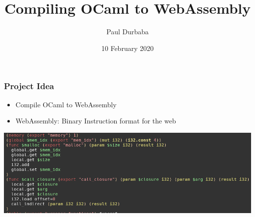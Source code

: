\documentclass[12pt]{beamer}
\title{Compiling OCaml to WebAssembly}
\author{Paul Durbaba}
\date{10 February 2020}
\begin{document}
	\begin{frame}
		\titlepage
	\end{frame}

	\begin{frame}
		\frametitle{Project Idea}
		\begin{itemize}
			\item Compile OCaml to WebAssembly
			\item WebAssembly: Binary Instruction format for the web
		\end{itemize}
		\begin{center}
			\includegraphics[width=0.8\linewidth]{basic-runtime}
		\end{center}
	\end{frame}
\end{document}
